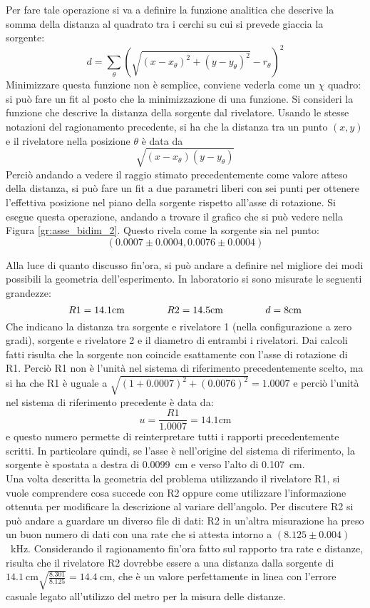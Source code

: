 Per fare tale operazione si va a definire la funzione analitica che descrive la somma della distanza al quadrato tra i cerchi su cui si prevede giaccia la sorgente:
$$d = \sum\limits_\theta \left(\sqrt{(x-x_\theta)^2+(y-y_\theta)^2} - r_\theta\right)^2$$
Minimizzare questa funzione non è semplice, conviene vederla come un $\chi$ quadro: si può fare un fit al posto che la minimizzazione di una funzione.
Si consideri la funzione che descrive la distanza della
sorgente dal rivelatore. Usando le stesse notazioni del ragionamento precedente, si ha che la distanza tra un punto $(x,y)$ e il rivelatore nella posizione $\theta$ è data da
$$\sqrt{(x-x_\theta)(y-y_\theta)}$$
Perciò andando a vedere il raggio stimato precedentemente come valore atteso della distanza, si può fare un fit a due parametri liberi con sei punti per ottenere
l'effettiva posizione nel piano della sorgente rispetto all'asse di rotazione. Si esegue questa operazione, andando a trovare il grafico che si può vedere nella
Figura \ref{gr:asse_bidim_2}. Questo rivela come la sorgente sia nel punto:
$$(0.0007 \pm 0.0004, 0.0076 \pm 0.0004)$$


Alla luce di quanto discusso fin'ora, si può andare a definire nel migliore dei modi possibili la geometria dell'esperimento. In laboratorio si sono misurate le
seguenti grandezze:
$$R1 = 14.1 \text{cm} \hspace{1.5cm} R2 = 14.5 \text{cm} \hspace{1.5cm} d = 8 \text{cm}$$
Che indicano la distanza tra sorgente e rivelatore 1 (nella configurazione a zero gradi), sorgente e rivelatore 2 e il diametro di entrambi i rivelatori. Dai calcoli fatti
risulta che la sorgente non coincide esattamente con l'asse di rotazione di R1. Perciò R1 non è l'unità nel sistema di riferimento precedentemente scelto, ma si ha che R1
è uguale a $\sqrt{(1+0.0007)^2+(0.0076)^2} = 1.0007$
e perciò l'unità nel sistema di riferimento precedente è data da:
$$u =\frac{R1}{1.0007}=14.1 \text{cm}$$
e questo numero permette di reinterpretare tutti i rapporti precedentemente scritti. In particolare quindi, se l'asse è nell'origine del sistema di riferimento, la
sorgente è spostata a destra di 0.0099~cm e verso l'alto di 0.107~cm.\\

Una volta descritta la geometria del problema utilizzando il rivelatore R1, si vuole comprendere cosa succede con R2 oppure come utilizzare l'informazione ottenuta per
modificare la descrizione al variare dell'angolo. Per discutere R2 si può andare a guardare un diverso file di dati: R2 in un'altra misurazione ha preso un buon numero
di dati con una rate che si attesta intorno a $(8.125 \pm 0.004)$~kHz. Considerando il ragionamento fin'ora fatto sul rapporto tra rate e distanze, risulta che il
rivelatore R2 dovrebbe essere a una distanza dalla sorgente di $14.1~\text{cm} \sqrt{\frac{8.301}{8.125}} = 14.4~\text{cm}$, che è un valore perfettamente in linea con
l'errore casuale legato all'utilizzo del metro per la misura delle distanze.\\

